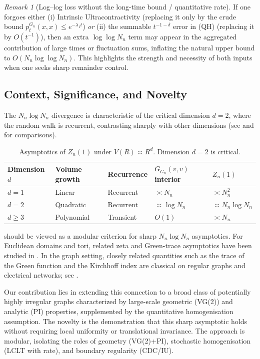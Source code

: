 \documentclass[reqno]{amsart}
\numberwithin{equation}{section}
\theoremstyle{definition}
\theoremstyle{remark}
\newtheorem{remark}[remark]{Remark}
\begin{document}
\begin{remark}[Log--log loss without the long-time bound / quantitative rate]\label{rem:loglog}
If one forgoes either (i) Intrinsic Ultracontractivity (replacing it only by the crude bound $p_t^{G_n}(x,x)\le e^{-\lambda_1 t}$) \emph{or} (ii) the summable $t^{-1-\delta}$ error in (QH) (replacing it by $O(t^{-1})$), then an extra $\log\log N_n$ term may appear in the aggregated contribution of large times or fluctuation sums, inflating the natural upper bound to $O(N_n \log\log N_n)$. This highlights the strength and necessity of both inputs when one seeks sharp remainder control.
\end{remark}

\subsection{Context, Significance, and Novelty}
The $N_n \log N_n$ divergence is characteristic of the critical dimension $d=2$, where the random walk is recurrent, contrasting sharply with other dimensions (see  and  for comparisons).

\begin{table}[htbp]
\centering
\small
\caption{Asymptotics of $Z_n(1)$ under $V(R) \asymp R^d$. Dimension $d=2$ is critical.}
\label{tab:growth}
\begin{tabular}{@{}lllll@{}}\toprule
	\textbf{Dimension $d$} & \textbf{Volume growth} & \textbf{Recurrence} & \textbf{$G_{G_n}(v,v)$ interior} & \textbf{$Z_n(1)$} \\
\midrule
$d=1$ & Linear & Recurrent & $\asymp N_n$ & $\asymp N_n^{2}$ \\
$d=2$ & Quadratic & Recurrent & $\asymp \log N_n$ & $\asymp N_n \log N_n$ \\
$d \ge 3$ & Polynomial & Transient & $O(1)$ & $\asymp N_n$ \\
\bottomrule
\end{tabular}
\end{table}

 should be viewed as a modular criterion for sharp $N_n\log N_n$ asymptotics.
For Euclidean domains and tori, related zeta and Green-trace asymptotics have been studied in \cite{Colin85,FrankSabin11}. In the graph setting, closely related quantities such as the trace of the Green function and the Kirchhoff index are classical on regular graphs and electrical networks; see \cite{MizunoTachikawa03,KleinRandic93,LyonsPeres16}.

Our contribution lies in extending this connection to a broad class of potentially highly irregular graphs characterized by large-scale geometric (VG(2)) and analytic (PI) properties, supplemented by the quantitative homogenisation assumption. The novelty is the demonstration that this sharp asymptotic holds without requiring local uniformity or translational invariance. The approach is modular, isolating the roles of geometry (VG(2)+PI), stochastic homogenisation (LCLT with rate), and boundary regularity (CDC/IU).
\end{document}
